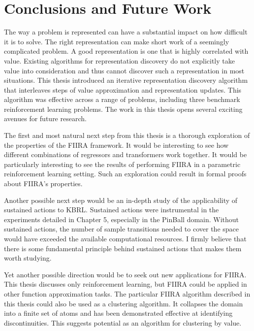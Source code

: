 \chapter{Conclusions and Future Work}
The way a problem is represented can have a substantial impact on how difficult
it is to solve.
The right representation can make short work of a seemingly complicated
problem.
A good representation is one that is highly correlated with value.
Existing algorithms for representation discovery do not explicitly take value
into consideration and thus cannot discover such a representation in most
situations.
This thesis introduced an iterative representation discovery algorithm that
interleaves steps of value approximation and representation updates.
This algorithm was effective across a range of problems, including three
benchmark reinforcement learning problems.
The work in this thesis opens several exciting avenues for future research.

The first and most natural next step from this thesis is a thorough exploration
of the properties of the FIIRA framework.
It would be interesting to see how different combinations of regressors and
transformers work together.
It would be particularly interesting to see the results of performing FIIRA in
a parametric reinforcement learning setting.
Such an exploration could result in formal proofs about FIIRA's properties.

Another possible next step would be an in-depth study of the applicability of
sustained actions to KBRL.
Sustained actions were instrumental in the experiments detailed in Chapter 5,
especially in the PinBall domain.
Without sustained actions, the number of sample transitions needed to cover
the space would have exceeded the available computational resources.
I firmly believe that there is some fundamental principle behind sustained
actions that makes them worth studying.

Yet another possible direction would be to seek out new applications for FIIRA.
This thesis discusses only reinforcement learning, but FIIRA could be applied
in other function approximation tasks.
The particular FIIRA algorithm described in this thesis could also be used as
a clustering algorithm.
It collapses the domain into a finite set of atoms and has been demonstrated
effective at identifying discontinuities.
This suggests potential as an algorithm for clustering by value.
